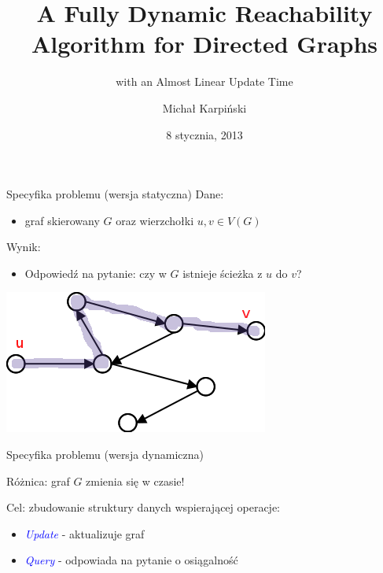 \documentclass{beamer}
\title{A Fully Dynamic Reachability Algorithm for Directed Graphs}
\subtitle{with an Almost Linear Update Time}
\author{Michał Karpiński}
\date{8 stycznia, 2013}
\newcommand{\emp}[1]{\textcolor{blue}{\textit{#1}}}
\begin{document}
\begin{frame}[plain]
  \titlepage
\end{frame}

\begin{frame}{Specyfika problemu (wersja statyczna)}
Dane: 

\begin{itemize}
\item graf skierowany $G$ oraz wierzchołki $u,v \in V(G)$
\end{itemize}

Wynik:

\begin{itemize}
\item Odpowiedź na pytanie: czy w $G$ istnieje ścieżka z $u$ do $v$?
\end{itemize}

\vspace{0.5cm}

\begin{center}
\includegraphics[scale=0.5]{Diagram1.png}
\end{center}

\end{frame}

\begin{frame}{Specyfika problemu (wersja dynamiczna)}

Różnica: graf $G$ zmienia się w czasie!


\vspace{0.5cm}

Cel: zbudowanie struktury danych wspierającej operacje:
\begin{itemize}
\item \emp{Update} - aktualizuje graf
\item \emp{Query} - odpowiada na pytanie o osiągalność
\end{itemize}
\end{frame}
\end{document}
